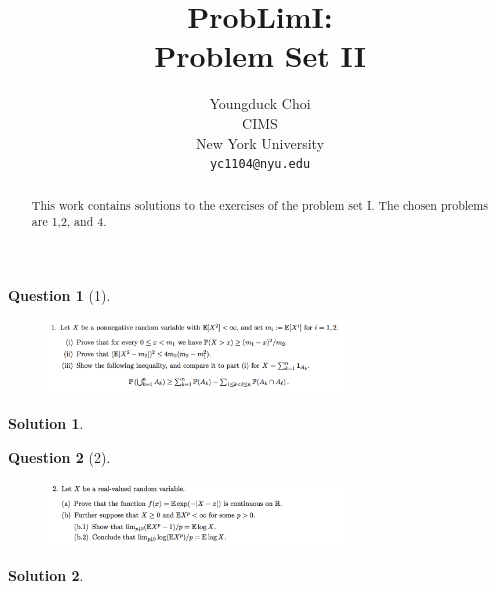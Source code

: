 \documentclass{article} %
\title{ProbLimI: \\
Problem Set II}
\author{
Youngduck Choi \\
CIMS \\
New York University\\
\texttt{yc1104@nyu.edu} \\
}
\theoremstyle{quest}
\newtheorem*{question}{Question}
\newtheorem*{solution}{Solution}
\begin{document}
\maketitle

\begin{abstract}
This work contains solutions to the exercises of the problem set I. The
chosen problems are 1,2, and 4.
\end{abstract}

\bigskip

\begin{question}[1]
\hfill
\begin{figure}[h!]
  \centering
    \includegraphics[width=0.7\textwidth]{problim-e2-p1.png}
\end{figure}
\end{question}
\begin{solution} \hfill \\
\end{solution}

\newpage

\begin{question}[2]
\hfill
\begin{figure}[h!]
  \centering
    \includegraphics[width=0.7\textwidth]{problim-e2-p2.png}
\end{figure}
\end{question}
\begin{solution} \hfill \\

\end{solution}

\newpage
\end{document}
